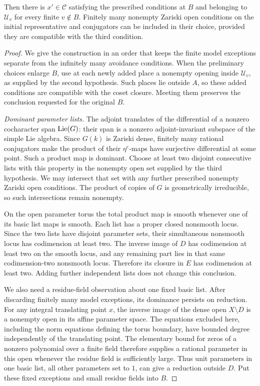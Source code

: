 \begin{proposition}
Then there is \(x'\in\mathcal C\) satisfying the prescribed conditions
at \(B\) and belonging to \(\mathcal U_v\) for every finite
\(v\notin B\).  Finitely many nonempty Zariski open conditions on
the initial representative and conjugators can be included in their
choice, provided they are compatible with the third condition.
\end{proposition}

\begin{proof}
We give the construction in an order that keeps the finite model
exceptions separate from the infinitely many avoidance conditions.
When the preliminary choices enlarge \(B\), use at each newly added
place a nonempty opening inside \(\mathcal U_v\), as supplied by the
second hypothesis.  Such places lie outside \(A\), so these added
conditions are compatible with the coset closure.  Meeting them
preserves the conclusion requested for the original \(B\).

\emph{Dominant parameter lists.}
The adjoint translates of the differential of a nonzero cocharacter
span \(\operatorname{Lie}(G)\): their span is a nonzero adjoint-invariant subspace
of the simple Lie algebra.  Since \(G(k)\) is Zariski dense, finitely
many rational conjugators make the product of their \(\eta^e\)-maps
have surjective differential at some point.  Such a product map is
dominant.  Choose at least two disjoint consecutive lists with this
property in the nonempty open set supplied by the third hypothesis.
We may intersect that set with any further prescribed nonempty
Zariski open conditions.  The product of copies of \(G\) is
geometrically irreducible, so such intersections remain nonempty.

On the open parameter torus the total product map is smooth whenever
one of its basic list maps is smooth.  Each list has a proper closed
nonsmooth locus.  Since the two lists have disjoint parameter sets,
their simultaneous nonsmooth locus has codimension at least two.
The inverse image of \(D\) has codimension at least two on the smooth
locus, and any remaining part lies in that same codimension-two
nonsmooth locus.  Therefore its closure in \(E\) has codimension at
least two.  Adding further independent lists does not change this
conclusion.

We also need a residue-field observation about one fixed basic list.
After discarding finitely many model exceptions, its dominance
persists on reduction.  For any integral translating point \(x\),
the inverse image of the dense open \(X\setminus D\) is a nonempty
open in its affine parameter space.  The equations excluded here,
including the norm equations defining the torus boundary, have
bounded degree independently of the translating point.  The
elementary bound for zeros of a nonzero polynomial over a finite
field therefore supplies a rational parameter in this open whenever
the residue field is sufficiently large.  Thus unit parameters in
one basic list, all other parameters set to \(1\), can give a
reduction outside \(D\).  Put these fixed exceptions and small
residue fields into \(B\).


\end{proof}
